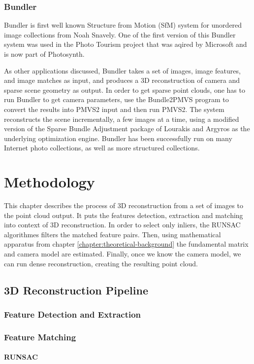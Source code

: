 \subsection*{Bundler}
Bundler is first well known Structure from Motion (SfM) system for unordered image collections from Noah Snavely. One of the first version of this Bundler system was used in the Photo Tourism project that was aqired by Microsoft and is now part of Photosynth. 

As other applications discussed, Bundler takes a set of images, image features, and image matches as input, and produces a 3D reconstruction of camera and sparse scene geometry as output. In order to get sparse point clouds, one has to run Bundler to get camera parameters, use the Bundle2PMVS program to convert the results into PMVS2 input and then run PMVS2. The system reconstructs the scene incrementally, a few images at a time, using a modified version of the Sparse Bundle Adjustment package of Lourakis and Argyros as the underlying optimization engine. Bundler has been successfully run on many Internet photo collections, as well as more structured collections. \cite{www:bundler}

\chapter{Methodology}
\label{chapter:methodology}
This chapter describes the process of 3D reconstruction from a set of images to the point cloud output. It puts the features detection, extraction and matching into context of 3D reconstruction. In order to select only inliers, the RUNSAC algorithmes filters the matched feature pairs. Then, using mathematical apparatus from chapter \ref{chapter:theoretical-background} the fundamental matrix and camera model are estimated. Finally, once we know the camera model, we can run dense reconstruction, creating the resulting point cloud.  
\section{3D Reconstruction Pipeline}
\subsection*{Feature Detection and Extraction}
\subsection*{Feature Matching}
\subsubsection*{RUNSAC}
